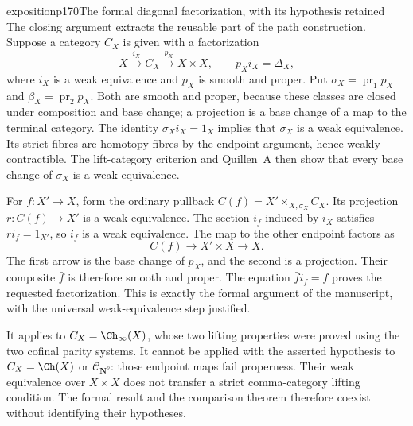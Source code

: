 \begin{dcomment}{exposition}{p170}{The formal diagonal factorization, with its hypothesis retained}
The closing argument extracts the reusable part of the path construction. Suppose a category $C_X$ is given with a factorization
\[
 X\xrightarrow{i_X}C_X\xrightarrow{p_X}X\times X,
 \qquad p_Xi_X=\Delta_X,
\]
where $i_X$ is a weak equivalence and $p_X$ is smooth and proper. Put $\sigma_X=\operatorname{pr}_1p_X$ and $\beta_X=\operatorname{pr}_2p_X$. Both are smooth and proper, because these classes are closed under composition and base change; a projection is a base change of a map to the terminal category. The identity $\sigma_Xi_X=1_X$ implies that $\sigma_X$ is a weak equivalence. Its strict fibres are homotopy fibres by the endpoint argument, hence weakly contractible. The lift-category criterion and Quillen~A then show that every base change of $\sigma_X$ is a weak equivalence.

For $f:X'\to X$, form the ordinary pullback $C(f)=X'\times_{X,\sigma_X}C_X$. Its projection $r:C(f)\to X'$ is a weak equivalence. The section $i_f$ induced by $i_X$ satisfies $ri_f=1_{X'}$, so $i_f$ is a weak equivalence. The map to the other endpoint factors as
\[
 C(f)\longrightarrow X'\times X\longrightarrow X.
\]
The first arrow is the base change of $p_X$, and the second is a projection. Their composite $\bar f$ is therefore smooth and proper. The equation $\bar f i_f=f$ proves the requested factorization. This is exactly the formal argument of the manuscript, with the universal weak-equivalence step justified.

It applies to $C_X=\Ch_\infty(X)$, whose two lifting properties were proved using the two cofinal parity systems. It cannot be applied with the asserted hypothesis to $C_X=\Ch(X)$ or $\mathcal C_{\mathbf N^o}$: those endpoint maps fail properness. Their weak equivalence over $X\times X$ does not transfer a strict comma-category lifting condition. The formal result and the comparison theorem therefore coexist without identifying their hypotheses.
\end{dcomment}


